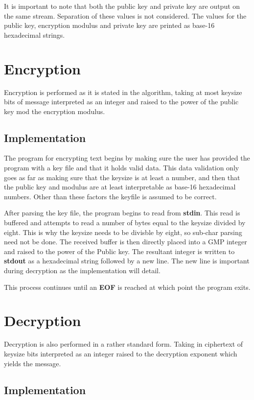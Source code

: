 It is important to note that both the public key and private key are output on the same stream. 
Separation of these values is not considered.
The values for the public key, encryption modulus and private key are printed as base-16 hexadecimal strings.

\section{ Encryption }

Encryption is performed as it is stated in the algorithm, taking at most keysize bits of message interpreted as an integer and raised to the power of the public key mod the encryption modulus.

\subsection{Implementation}

The program for encrypting text begins by making sure the user has provided the program with a key file and that it holds valid data.
This data validation only goes as far as making sure that the keysize is at least a number, and then that the public key and modulus are at least interpretable as base-16 hexadecimal numbers. 
Other than these factors the keyfile is assumed to be correct.

After parsing the key file, the program begins to read from \textbf{stdin}. 
This read is buffered and attempts to read a number of bytes equal to the keysize divided by eight.
This is why the keysize needs to be divisble by eight, so sub-char parsing need not be done.
The received buffer is then directly placed into a GMP integer and raised to the power of the Public key.
The resultant integer is written to \textbf{stdout} as a hexadecimal string followed by a new line.
The new line is important during decryption as the implementation will detail.

This process continues until an \textbf{EOF} is reached at which point the program exits.


\section{ Decryption }

Decryption is also performed in a rather standard form. Taking in ciphertext of keysize bits interpreted as an integer raised to the decryption exponent which yields the message.

\subsection{Implementation}

